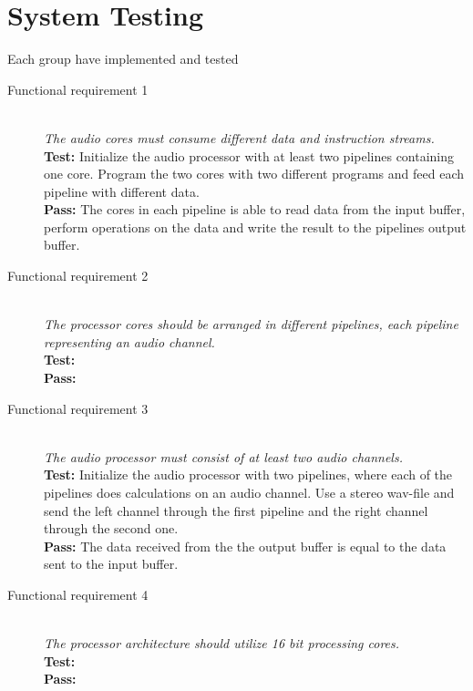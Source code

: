 \section{System Testing}
Each group have implemented and tested 

\begin{description}
    \item[Functional requirement 1] \hfill \\
        \textit{The audio cores must consume different data and instruction streams.} \\
        \textbf{Test:} Initialize the audio processor with at least two pipelines
        containing one core. Program the two cores with two different programs and feed
        each pipeline with different data.\\
        \textbf{Pass:} The cores in each pipeline is able to read data from the input buffer,
        perform operations on the data and write the result to the pipelines output buffer.\\
    \item[Functional requirement 2] \hfill \\
        \textit{The processor cores should be arranged in different pipelines,
        each pipeline representing an audio channel.} \\
        \textbf{Test:} \\
        \textbf{Pass:} \\
    \item[Functional requirement 3] \hfill \\
        \textit{The audio processor must consist of at least two audio channels.} \\
        \textbf{Test:} Initialize the audio processor with two pipelines, where each of the 
        pipelines does calculations on an audio channel. Use a stereo wav-file and send
        the left channel through the first pipeline and the right channel through the
        second one. \\
        \textbf{Pass:} The data received from the the output buffer is equal to the
        data sent to the input buffer. \\
    \item[Functional requirement 4] \hfill \\
        \textit{The processor architecture should utilize 16 bit processing cores.} \\
        \textbf{Test:} \\
        \textbf{Pass:} \\

\end{description}
